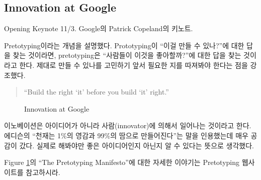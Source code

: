 \documentclass[11pt]{article}
\begin{document}
\subsection{Innovation at Google}
Opening Keynote 11/3. Google의 Patrick Copeland의 키노트.

Pretotyping\cite{pretotype}이라는 개념을 설명했다.
Prototyping이 ``이걸 만들 수 있나?''에 대한 답을 찾는 
것이라면, pretotyping은 ``사람들이 이것을 좋아할까?''에 대한 답을 찾는 
것이라고 한다.
제대로 만들 수 있나를 고민하기 앞서 필요한 지를 따져봐야 한다는 점을 
강조했다.

\begin{quote}
``Build the right `it' before you build `it' right.''
\end{quote}

\begin{figure}[t]
    \begin{Frame}
        \begin{center}
        \end{center}
    \end{Frame}
    \caption{Innovation at Google}
    \label{pretotyping}
\end{figure}

이노베이션은 아이디어가 아니라 사람(innovator)에 의해서 일어나는 것이라고 한다. 
에디슨의 ``천재는 1\%의 영감과 99\%의 땀으로 만들어진다''는 말을
인용했는데 매우 공감이 갔다. 실제로 해봐야만 좋은 아이디어인지 아닌지 
알 수 있다는 뜻으로 생각했다.

Figure \ref{pretotyping}의 ``The Pretotyping Manifesto''에 대한 자세한 
이야기는 Pretotyping 웹사이트를 참고하시라.

%  
%  
 
\end{document}
